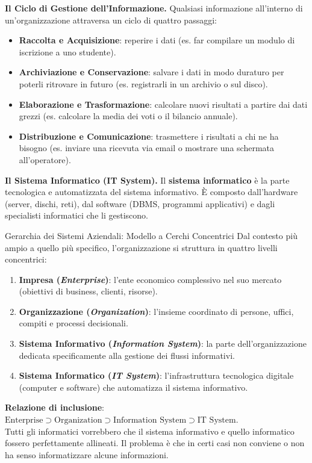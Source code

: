 \documentclass[12pt]{extarticle}
\begin{document}
\medskip
\noindent \textbf{Il Ciclo di Gestione dell'Informazione.} Qualsiasi informazione all'interno di un'organizzazione attraversa un ciclo di quattro passaggi:
\begin{itemize}
    \item \textbf{Raccolta e Acquisizione}: reperire i dati (es. far compilare un modulo di iscrizione a uno studente).
    \item \textbf{Archiviazione e Conservazione}: salvare i dati in modo duraturo per poterli ritrovare in futuro (es. registrarli in un archivio o sul disco).
    \item \textbf{Elaborazione e Trasformazione}: calcolare nuovi risultati a partire dai dati grezzi (es. calcolare la media dei voti o il bilancio annuale).
    \item \textbf{Distribuzione e Comunicazione}: trasmettere i risultati a chi ne ha bisogno (es. inviare una ricevuta via email o mostrare una schermata all'operatore).
\end{itemize}

\medskip
\noindent \textbf{Il Sistema Informatico (IT System).} Il \textbf{sistema informatico} è la parte tecnologica e automatizzata del sistema informativo. È composto dall'hardware (server, dischi, reti), dal software (DBMS, programmi applicativi) e dagli specialisti informatici che li gestiscono.

\begin{cbox}{Gerarchia dei Sistemi Aziendali: Modello a Cerchi Concentrici}
\noindent Dal contesto più ampio a quello più specifico, l'organizzazione si struttura in quattro livelli concentrici:
\begin{enumerate}
    \item \textbf{Impresa (\textit{Enterprise})}: l'ente economico complessivo nel suo mercato (obiettivi di business, clienti, risorse).
    \item \textbf{Organizzazione (\textit{Organization})}: l'insieme coordinato di persone, uffici, compiti e processi decisionali.
    \item \textbf{Sistema Informativo (\textit{Information System})}: la parte dell'organizzazione dedicata specificamente alla gestione dei flussi informativi.
    \item \textbf{Sistema Informatico (\textit{IT System})}: l'infrastruttura tecnologica digitale (computer e software) che automatizza il sistema informativo.
\end{enumerate}
\medskip
\noindent \textbf{Relazione di inclusione}: $\text{Enterprise} \supset \text{Organization} \supset \text{Information System} \supset \text{IT System}$.\\

\noindent Tutti gli informatici vorrebbero che il sistema informativo e quello informatico fossero perfettamente allineati. Il problema è che in certi casi non conviene o non ha senso informatizzare alcune informazioni.
\end{cbox}
\end{document}
